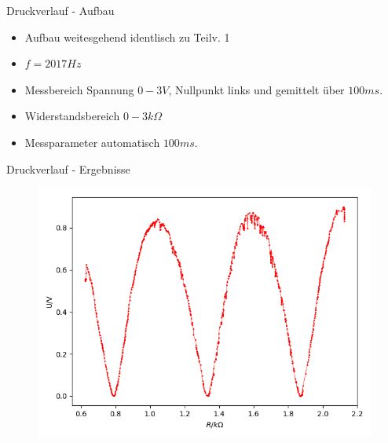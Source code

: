 \documentclass[12pt]{beamer}
\begin{document}
	\begin{frame}{Druckverlauf - Aufbau}
	\begin{itemize}
	\item Aufbau weitesgehend identlisch zu Teilv. 1
	\item $f=2017Hz$
	\item Messbereich Spannung $0-3V$, Nullpunkt links und gemittelt über $100ms$.
	\item Widerstandsbereich $0-3k \Omega$
	\item Messparameter automatisch $100ms$.
	\end{itemize}
	
	\end{frame}
	
	\begin{frame}{Druckverlauf - Ergebnisse}
	\begin{figure}
	\includegraphics[scale=0.5]{druckverlauf}
	\end{figure}
	\end{frame}
	
\end{document}
